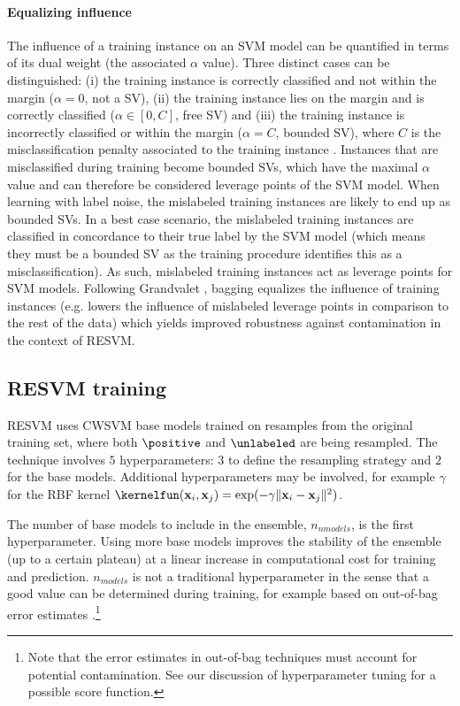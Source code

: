 \paragraph{Equalizing influence} The influence of a training instance on an SVM model can be quantified in terms of its dual weight (the associated $\alpha$ value). Three distinct cases can be distinguished: (i) the training instance is correctly classified and not within the margin ($\alpha = 0$, not a SV), (ii) the training instance lies on the margin and is correctly classified ($\alpha \in [0, C]$, free SV) and (iii) the training instance is incorrectly classified or within the margin ($\alpha = C$, bounded SV), where $C$ is the misclassification penalty associated to the training instance \citep{bottou2007support}. Instances that are misclassified during training become bounded SVs, which have the maximal $\alpha$ value and can therefore be considered leverage points of the SVM model. When learning with label noise, the mislabeled training instances are likely to end up as bounded SVs. In a best case scenario, the mislabeled training instances are classified in concordance to their true label by the SVM model (which means they must be a bounded SV as the training procedure identifies this as a misclassification). As such, mislabeled training instances act as leverage points for SVM models. Following Grandvalet \citep{grandvalet2004bagging}, bagging equalizes the influence of training instances (e.g. lowers the influence of mislabeled leverage points in comparison to the rest of the data) which yields improved robustness against contamination in the context of RESVM. 


\subsection{RESVM training}
RESVM uses CWSVM base models trained on resamples from the original training set, where both $\positive$ and $\unlabeled$ are being resampled. The technique involves $5$ hyperparameters: $3$ to define the resampling strategy and $2$ for the base models. Additional hyperparameters may be involved, for example $\gamma$ for the RBF kernel $\kernelfun(\mathbf{x}_i, \mathbf{x}_j) = \exp(-\gamma \| \mathbf{x}_i-\mathbf{x}_j\|^2)$.

The number of base models to include in the ensemble, $n_{nmodels}$, is the first hyperparameter. Using more base models improves the stability of the ensemble (up to a certain plateau) at a linear increase in computational cost for training and prediction. $n_{models}$ is not a traditional hyperparameter in the sense that a good value can be determined during training, for example based on out-of-bag error estimates \citep{banfield2007comparison}.\footnote{\label{labelednote}Note that the error estimates in out-of-bag techniques must account for potential contamination. See our discussion of hyperparameter tuning for a possible score function.}

